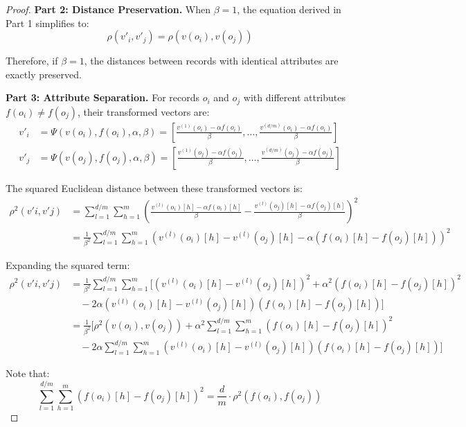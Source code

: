 \documentclass[numbers,sort]{article}
\begin{document}
\begin{proof}
\textbf{Part 2: Distance Preservation.}
When $\beta = 1$, the equation derived in Part 1 simplifies to:
\begin{equation}
\rho(v'_i, v'_j) = \rho(v(o_i), v(o_j))
\end{equation}

Therefore, if $\beta = 1$, the distances between records with identical attributes are exactly preserved.

\textbf{Part 3: Attribute Separation.}
For records $o_i$ and $o_j$ with different attributes $f(o_i) \neq f(o_j)$, their transformed vectors are:
\begin{align}
v'_i &= \Psi(v(o_i), f(o_i), \alpha, \beta) = \left[\frac{v^{(1)}(o_i) - \alpha f(o_i)}{\beta}, \ldots, \frac{v^{(d/m)}(o_i) - \alpha f(o_i)}{\beta}\right] \\
v'_j &= \Psi(v(o_j), f(o_j), \alpha, \beta) = \left[\frac{v^{(1)}(o_j) - \alpha f(o_j)}{\beta}, \ldots, \frac{v^{(d/m)}(o_j) - \alpha f(o_j)}{\beta}\right]
\end{align}

The squared Euclidean distance between these transformed vectors is:
\begin{align}
\rho^2(v'i, v'j) &= \sum_{l=1}^{d/m} \sum_{h=1}^{m} \left(\frac{v^{(l)}(o_i)[h] - \alpha f(o_i)[h]}{\beta} - \frac{v^{(l)}(o_j)[h] - \alpha f(o_j)[h]}{\beta}\right)^2 \\
&= \frac{1}{\beta^2}\sum_{l=1}^{d/m} \sum_{h=1}^{m} \left(v^{(l)}(o_i)[h] - v^{(l)}(o_j)[h] - \alpha(f(o_i)[h] - f(o_j)[h])\right)^2
\end{align}

Expanding the squared term:
\begin{align}
\rho^2(v'i, v'j) &= \frac{1}{\beta^2}\sum_{l=1}^{d/m} \sum_{h=1}^{m} \Big[ (v^{(l)}(o_i)[h] - v^{(l)}(o_j)[h])^2 + \alpha^2(f(o_i)[h] - f(o_j)[h])^2 \\
&\quad - 2\alpha(v^{(l)}(o_i)[h] - v^{(l)}(o_j)[h])(f(o_i)[h] - f(o_j)[h]) \Big] \\
&= \frac{1}{\beta^2}\Big[\rho^2(v(o_i), v(o_j)) + \alpha^2 \sum_{l=1}^{d/m} \sum_{h=1}^{m} (f(o_i)[h] - f(o_j)[h])^2 \\
&\quad - 2\alpha \sum_{l=1}^{d/m} \sum_{h=1}^{m} (v^{(l)}(o_i)[h] - v^{(l)}(o_j)[h])(f(o_i)[h] - f(o_j)[h])\Big]
\end{align}

Note that:
\begin{equation}
\sum_{l=1}^{d/m} \sum_{h=1}^{m} (f(o_i)[h] - f(o_j)[h])^2 = \frac{d}{m} \cdot \rho^2(f(o_i), f(o_j))
\end{equation}


\end{proof}
\end{document}

